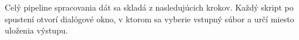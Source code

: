 Celý pipeline spracovania dát sa skladá z nasledujúcich krokov. Každý skript po spustení otvorí dialógové okno, v ktorom sa vyberie vstupný súbor a určí miesto uloženia výstupu.
